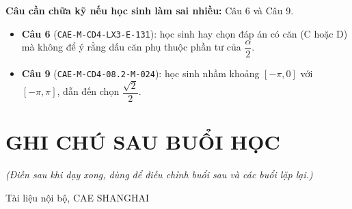 \documentclass[11pt, a4paper]{article}
\begin{document}
\textbf{Câu cần chữa kỹ nếu học sinh làm sai nhiều:} Câu 6 và Câu 9.

\begin{itemize}[leftmargin=1.4em, itemsep=2pt]
\item \textbf{Câu 6} (\texttt{CAE-M-CD4-LX3-E-131}): học sinh hay chọn đáp án có căn (C hoặc D) mà không để ý rằng dấu căn phụ thuộc phần tư của $\dfrac{\alpha}{2}$.
\item \textbf{Câu 9} (\texttt{CAE-M-CD4-08.2-M-024}): học sinh nhầm khoảng $[-\pi, 0]$ với $[-\pi, \pi]$, dẫn đến chọn $\dfrac{\sqrt{2}}{2}$.
\end{itemize}

\section{GHI CHÚ SAU BUỔI HỌC}

\emph{(Điền sau khi dạy xong, dùng để điều chỉnh buổi sau và các buổi lặp lại.)}

\vspace{0.8cm}
\begin{center}
{\footnotesize\color{cae_blue} Tài liệu nội bộ, CAE SHANGHAI}
\end{center}
\end{document}
